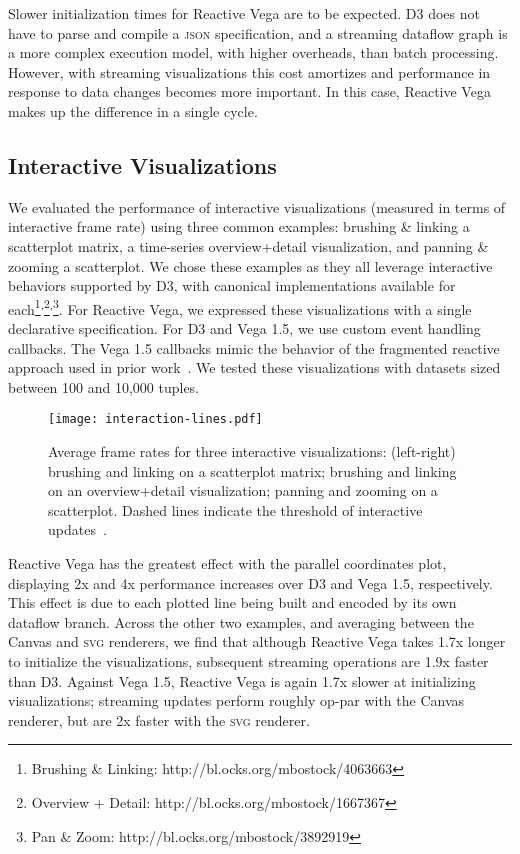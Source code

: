 Slower initialization times for Reactive Vega are to be expected. D3 does not
have to parse and compile a \textsc{json} specification, and a streaming
dataflow graph is a more complex execution model, with higher overheads, than
batch processing. However, with streaming visualizations this cost amortizes and
performance in response to data changes becomes more important. In this case,
Reactive Vega makes up the difference in a single cycle.

\vspace{-10pt}

\subsection{Interactive Visualizations}

\vspace{-7pt}

We evaluated the performance of interactive visualizations (measured in terms of
interactive frame rate) using three common examples: brushing \& linking a
scatterplot matrix, a time-series overview+detail visualization, and panning \&
zooming a scatterplot. We chose these examples as they all leverage interactive
behaviors supported by D3, with canonical implementations available for
each\footnote{Brushing \& Linking:
http://bl.ocks.org/mbostock/4063663}\textsuperscript{,}\footnote{Overview +
Detail: http://bl.ocks.org/mbostock/1667367}\textsuperscript{,}\footnote{Pan \&
Zoom: http://bl.ocks.org/mbostock/3892919}. For Reactive Vega, we expressed
these visualizations with a single declarative specification. For D3 and Vega
1.5, we use custom event handling callbacks. The Vega 1.5 callbacks mimic the
behavior of the fragmented reactive approach used in prior
work~\cite{satyanarayan:declarative}. We tested these visualizations with
datasets sized between 100 and 10,000 tuples.

\begin{figure}[t!]
  \centering
  \texttt{[image: interaction-lines.pdf]}
  \caption{Average frame rates for three interactive visualizations: (left-right)
  brushing and linking on a scatterplot matrix; brushing and linking on an
  overview+detail visualization; panning and zooming on a scatterplot. Dashed
  lines indicate the threshold of interactive updates~\cite{card:modelhuman}.}
  \label{fig:vg:interactive_benchmark}
\end{figure}

Reactive Vega has the greatest effect with the parallel coordinates plot,
displaying 2x and 4x performance increases over D3 and Vega 1.5, respectively.
This effect is due to each plotted line being built and encoded by its own
dataflow branch. Across the other two examples, and averaging between the Canvas
and \textsc{svg} renderers, we find that although Reactive Vega takes 1.7x
longer to initialize the visualizations, subsequent streaming operations are
1.9x faster than D3. Against Vega 1.5, Reactive Vega is again 1.7x slower at
initializing visualizations; streaming updates perform roughly op-par with the
Canvas renderer, but are 2x faster with the \textsc{svg} renderer.